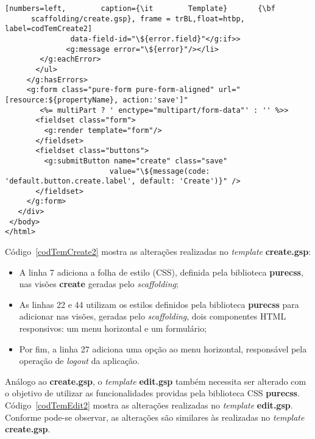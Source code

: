\begin{lstlisting}[numbers=left,        caption={\it        Template}       {\bf
      scaffolding/create.gsp}, frame = trBL,float=htbp, label=codTemCreate2]
               data-field-id="\${error.field}"</g:if>>
              <g:message error="\${error}"/></li>
        </g:eachError>
       </ul>
     </g:hasErrors>
     <g:form class="pure-form pure-form-aligned" url="[resource:${propertyName}, action:'save']" 
        <%= multiPart ? ' enctype="multipart/form-data"' : '' %>>
       <fieldset class="form">
         <g:render template="form"/>
       </fieldset>
       <fieldset class="buttons">
         <g:submitButton name="create" class="save" 
                        value="\${message(code: 'default.button.create.label', default: 'Create')}" />
       </fieldset>
     </g:form>
   </div>
 </body>
</html>
\end{lstlisting}

\newpage

\noindent  Código~\ref{codTemCreate2} mostra  as alterações  realizadas  no {\it
  template} {\bf create.gsp}: 

\begin{itemize}

\vspace{0.3cm}

\item A linha 7 adiciona a  folha de estilo (CSS), definida pela biblioteca {\bf
  purecss}, nas visões {\bf create} geradas pelo {\it scaffolding}; 

\vspace{0.3cm}

\item  As linhas  22 e  44 utilizam  os estilos  definidos pela  biblioteca {\bf
  purecss}  para adicionar  nas  visões, geradas  pelo  {\it scaffolding},  dois
  componentes HTML responsivos: um menu horizontal e um formulário; 

\vspace{0.3cm} 

\item Por  fim, a linha  27 adiciona uma  opção ao menu  horizontal, responsável
  pela operação de {\it logout} da aplicação.  

\end{itemize}

\vspace{0.3cm}

Análogo ao  {\bf create.gsp}, o  {\it template} {\bf edit.gsp}  também necessita
ser  alterado  com o  objetivo  de  utilizar  as funcionalidades  providas  pela
biblioteca  CSS {\bf  purecss}.  Código~\ref{codTemEdit2}  mostra  as alterações
realizadas  no {\it  template} {\bf  edit.gsp}.  Conforme  pode-se  observar, as
alterações são similares às realizadas no {\it template} {\bf create.gsp}.  

